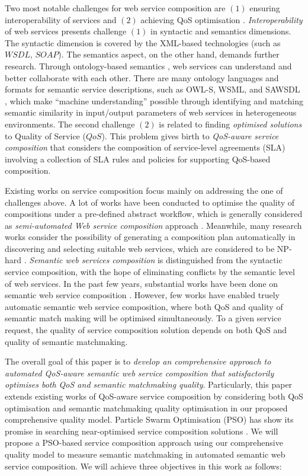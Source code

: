 \documentclass{IEEEtran}
\begin{document}
Two most notable challenges for web service composition are $(1)$ ensuring interoperability of services and $(2)$ achieving QoS optimisation \cite{fensel2011semantic}. \textit{Interoperability} of web services presents challenge $(1)$ in syntactic and semantics dimensions. The syntactic dimension is covered by the XML-based technologies (such as $WSDL$, $SOAP$). The semantics aspect, on the other hand, demands further research. Through ontology-based semantics \cite{o2005review}, web services can understand and better collaborate with each other. There are many ontology languages and formats for semantic service descriptions, such as OWL-S, WSML, and SAWSDL \cite{petrie2016web}, which make ``machine understanding'' possible through identifying and matching semantic similarity in input/output parameters of web services in heterogeneous environments. The second challenge $(2)$ is related to finding \textit{optimised solutions} to Quality of Service ($QoS$). This problem gives birth to \textit{QoS-aware service composition} that considers the composition of service-level agreements (SLA) \cite {sahai2002automated} involving a collection of SLA rules and policies for supporting QoS-based composition.

Existing works on service composition focus mainly on addressing the one of challenges above. A lot of works have been conducted to optimise the quality of compositions under a pre-defined abstract workflow, which is generally considered as \textit{semi-automated Web service composition} approach \cite{parejo2008qos,bahadori2009optimal}. Meanwhile, many research works consider the possibility of generating a composition plan automatically in discovering and selecting suitable web services, which are considered to be NP-hard \cite{moghaddam2014service}. \textit{Semantic web services composition} is distinguished from the syntactic service composition, with the hope of eliminating conflicts by the semantic level of web services. In the past few years, substantial works have been done on semantic web service composition \cite{lecue2009optimizing,fanjiang2014semantic,pop2009immune}. However, few works have enabled truely automatic semantic web service composition, where both QoS and quality of semantic match making will be optimised simultaneously. To a given service request, the quality of service composition solution depends on both QoS and quality of semantic matchmaking.

The overall goal of this paper is to \textit{develop an comprehensive approach to automated QoS-aware semantic web service composition that satisfactorily optimises both QoS and semantic matchmaking quality}. Particularly, this paper extends existing works of QoS-aware service composition by considering both QoS optimisation and semantic matchmaking quality optimisation in our proposed comprehensive quality model. Particle Swarm Optimisation (PSO) has show its promise in searching near-optimised service composition solutions \cite{da2016particle}. We will propose a PSO-based service composition approach using our comprehensive quality model to measure semantic matchmaking in automated semantic web service composition. We will achieve three objectives in this work as follows:
\end{document}
